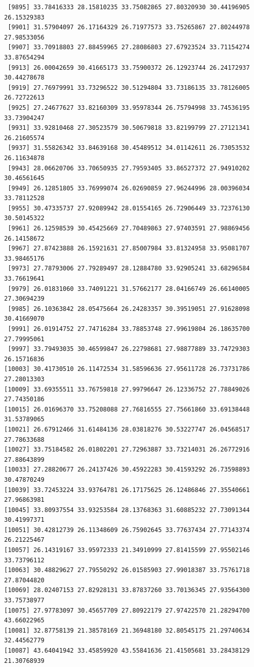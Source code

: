 \documentclass[
  letterpaper,
  DIV=11,
  numbers=noendperiod]{scrartcl}
\begin{document}
\begin{verbatim}
 [9895] 33.78416333 28.15810235 33.75082865 27.80320930 30.44196905 26.15329383
 [9901] 31.57904097 26.17164329 26.71977573 33.75265867 27.80244978 27.98533056
 [9907] 33.70918803 27.88459965 27.28086803 27.67923524 33.71154274 33.87654294
 [9913] 26.00042659 30.41665173 33.75900372 26.12923744 26.24172937 30.44278678
 [9919] 27.76979991 33.73296522 30.51294804 33.73186135 33.78126005 26.72722613
 [9925] 27.24677627 33.82160309 33.95978344 26.75794998 33.74536195 33.73904247
 [9931] 33.92810468 27.30523579 30.50679818 33.82199799 27.27121341 26.21605574
 [9937] 31.55826342 33.84639168 30.45489512 34.01142611 26.73053532 26.11634878
 [9943] 28.06620706 33.70650935 27.79593405 33.86527372 27.94910202 30.46561645
 [9949] 26.12851805 33.76999074 26.02690859 27.96244996 28.00396034 33.78112528
 [9955] 30.47335737 27.92089942 28.01554165 26.72906449 33.72376130 30.50145322
 [9961] 26.12598539 30.45425669 27.70489863 27.97403591 27.98869456 26.14158672
 [9967] 27.87423888 26.15921631 27.85007984 33.81324958 33.95081707 33.98465176
 [9973] 27.78793006 27.79289497 28.12884780 33.92905241 33.68296584 33.76619641
 [9979] 26.01831060 33.74091221 31.57662177 28.04166749 26.66140005 27.30694239
 [9985] 26.10363842 28.05475664 26.24283357 30.39519051 27.91628098 30.41669070
 [9991] 26.01914752 27.74716284 33.78853748 27.99619804 26.18635700 27.79995061
 [9997] 33.79493035 30.46599847 26.22798681 27.98877889 33.74729303 26.15716836
[10003] 30.41730510 26.11472534 31.58596636 27.95611728 26.73731786 27.28013303
[10009] 33.69355511 33.76759818 27.99796647 26.12336752 27.78849026 27.74350186
[10015] 26.01696370 33.75208088 27.76816555 27.75661860 33.69138448 31.53789065
[10021] 26.67912466 31.61484136 28.03818276 30.53227747 26.04568517 27.78633688
[10027] 33.75184582 26.01802201 27.72963887 33.73214031 26.26772916 27.88643899
[10033] 27.28820677 26.24137426 30.45922283 30.41593292 26.73598893 30.47870249
[10039] 33.72453224 33.93764781 26.17175625 26.12486846 27.35540661 27.96863981
[10045] 33.80937554 33.93253584 28.13768363 31.60885232 27.73091344 30.41997371
[10051] 30.42812739 26.11348609 26.75902645 33.77637434 27.77143374 26.21225467
[10057] 26.14319167 33.95972333 21.34910999 27.81415599 27.95502146 33.73796112
[10063] 30.48829627 27.79550292 26.01585903 27.99018387 33.75761718 27.87044820
[10069] 28.02407153 27.82928131 33.87837260 33.70136345 27.93564300 33.75738977
[10075] 27.97783097 30.45657709 27.80922179 27.97422570 21.28294700 43.66022965
[10081] 32.87758139 21.38578169 21.36948180 32.80545175 21.29740634 32.44562779
[10087] 43.64041942 33.45859920 43.55841636 21.41505681 33.28438129 21.30768939

\end{verbatim}
\end{document}
